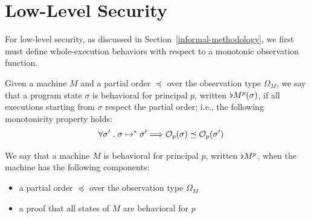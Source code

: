 
\section{Low-Level Security}
For low-level security, as discussed in Section~\ref{informal-methodology}, 
we first must define whole-execution behaviors
with respect to a monotonic observation function.

\begin{definition}
\label{behavioral-state}
Given a machine $M$ and a partial order $\preceq$ over the observation 
type $\Omega_M$, we say that a program state $\sigma$ is behavioral
for principal $p$, written $\flat M^{p}(\sigma)$,
if all executions starting from $\sigma$ respect 
the partial order; i.e., the following monotonicity property holds:
\[\quad \forall \sigma' \hspace{1mm} . \hspace{1mm} \sigma \mapsto^* \sigma' 
\Longrightarrow \mathcal{O}_{p}(\sigma) \preceq \mathcal{O}_{p}(\sigma')\]
\end{definition}

\begin{definition}
\label{behavioral-machine}
We say that a machine $M$ is behavioral for principal $p$, written 
$\flat M^{p}$, when the machine has the following components:
\begin{itemize}
\item a partial order $\preceq$ over the observation type $\Omega_M$
\item a proof that all states of $M$ are behavioral for $p$
\end{itemize}
\end{definition}

